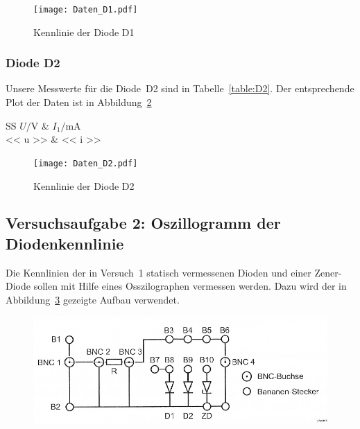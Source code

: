 \begin{figure}[htbp]
	\centering
	\caption{%
		Kennlinie der Diode D1
	}
	\label{fig:D1}
	\texttt{[image: Daten\_D1.pdf]}
\end{figure}

\FloatBarrier
\subsubsection{Diode D2}

Unsere Messwerte für die Diode~D2 sind in Tabelle~\ref{table:D2}. Der
entsprechende Plot der Daten ist in Abbildung~\ref{fig:D2}

\begin{table}[htbp]
	\centering
	\caption{%
		Messdaten zur Diode D2
	}
	\label{table:D2}
	\begin{tabular}{SS}
		{$U / \si\volt$} & {$I_1 / \si{\milli\ampere}$} \\
		\hline
		<< u >> & << i >> \\
	\end{tabular}
\end{table}

\begin{figure}[htbp]
	\centering
	\caption{%
		Kennlinie der Diode D2
	}
	\label{fig:D2}
	\texttt{[image: Daten\_D2.pdf]}
\end{figure}

\FloatBarrier
\subsection{Versuchsaufgabe 2: Oszillogramm der Diodenkennlinie}

Die Kennlinien der in Versuch~1 statisch vermessenen Dioden und einer
Zener-Diode sollen mit Hilfe eines Osszilographen vermessen werden. Dazu wird
der in Abbildung~\ref{fig:2-6} gezeigte Aufbau verwendet.

\begin{figure}[htbp]
	\centering
	\caption{%
		\cite[Abbildung~2.6]{physik313-Anleitung}
	}
	\label{fig:2-6}
	\includegraphics[width=.8\linewidth]{Bilder_aus_Anleitung/2-6.png}
\end{figure}

